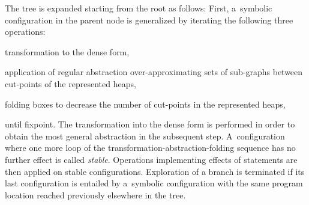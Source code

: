 {The tree is expanded starting from the root as follows:
First, a~symbolic configuration in the parent node is generalized by iterating
the following three operations:
%
\begin{inparaenum}[(i)]
  \item  transformation to the dense form, 
  \item  application of regular abstraction over-ap\-prox\-imating sets of sub-graphs between
    cut-points of the represented heaps,
  \item  folding boxes to decrease the number of cut-points in the represented
    heaps,
\end{inparaenum}
%
until fixpoint.
The transformation into the dense form is performed in order to obtain the most
general abstraction in the subsequent step.
A~configuration where one more loop of the transformation-abstraction-folding sequence has
no further effect is called \emph{stable}.
%
Operations implementing effects of statements are then applied on stable configurations.
%
Exploration of a branch is terminated if its last configuration is entailed
by a~symbolic configuration with the same program location reached previously 
elsewhere in the tree.

}
